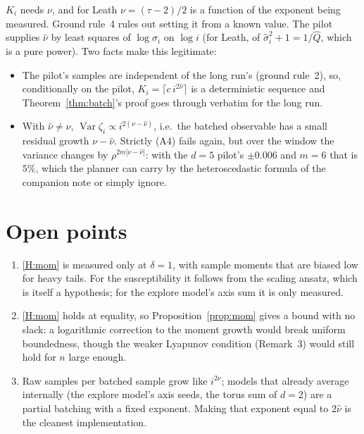 \documentclass[11pt]{article}
\newcommand{\Var}{\operatorname{Var}}
\begin{document}
$K_i$ needs $\nu$, and for Leath $\nu=(\tau-2)/2$ is a function of the
exponent being measured. Ground rule~4 rules out setting it from a known value.
The pilot supplies $\hat\nu$ by least squares of $\log\hat\sigma_i$ on $\log i$
(for Leath, of $\hat\sigma_i^2+1=1/\hat Q$, which is a pure power). Two facts
make this legitimate:

\begin{itemize}
  \item The pilot's samples are independent of the long run's (ground rule~2),
  so, conditionally on the pilot, $K_i=\lceil c\,i^{2\hat\nu}\rceil$ is a
  deterministic sequence and Theorem~\ref{thm:batch}'s proof goes through
  verbatim for the long run.
  \item With $\hat\nu\ne\nu$, $\Var\zeta_i\propto i^{2(\nu-\hat\nu)}$, i.e.\ the
  batched observable has a small residual growth $\nu-\hat\nu$. Strictly (A4)
  fails again, but over the window the variance changes by
  $\rho^{2m|\nu-\hat\nu|}$: with the $d=5$ pilot's $\pm0.006$ and $m=6$ that
  is $5\%$, which the planner can carry by the heteroscedastic formula of the
  companion note or simply ignore.
\end{itemize}

\section{Open points}

\begin{enumerate}
  \item \ref{H:mom} is measured only at $\delta=1$, with sample moments that
  are biased low for heavy tails. For the susceptibility it follows from the
  scaling ansatz, which is itself a hypothesis; for the explore model's axis
  sum it is only measured.
  \item \ref{H:mom} holds at equality, so Proposition~\ref{prop:mom} gives a
  bound with no slack: a logarithmic correction to the moment growth would break
  uniform boundedness, though the weaker Lyapunov condition (Remark~3) would
  still hold for $n$ large enough.
  \item Raw samples per batched sample grow like $i^{2\nu}$; models that
  already average internally (the explore model's axis seeds, the torus
  sum of $d=2$) are a partial batching with a fixed exponent. Making that
  exponent equal to $2\hat\nu$ is the cleanest implementation.
\end{enumerate}
\end{document}
